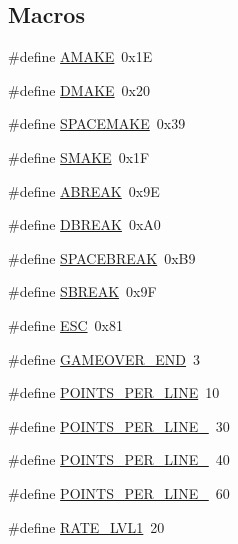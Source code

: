 \subsection*{Macros}
\begin{DoxyCompactItemize}
\item 
\#define \mbox{\hyperlink{group__game_ga690efe7a045abbfc9b27e560a2ec9513}{A\+M\+A\+KE}}~0x1E
\item 
\#define \mbox{\hyperlink{group__game_ga44e36af0ac2ecc5ef350ba0be8942ec2}{D\+M\+A\+KE}}~0x20
\item 
\#define \mbox{\hyperlink{group__game_gac1a92d19df172666cb200a4af8dda91c}{S\+P\+A\+C\+E\+M\+A\+KE}}~0x39
\item 
\#define \mbox{\hyperlink{group__game_ga03947a021c40104691ad783d365f4e10}{S\+M\+A\+KE}}~0x1F
\item 
\#define \mbox{\hyperlink{group__game_ga1e09a1aa8665e3937510ff8c14fc7fa7}{A\+B\+R\+E\+AK}}~0x9E
\item 
\#define \mbox{\hyperlink{group__game_gab38702ad72d18f40a1ee070106d30718}{D\+B\+R\+E\+AK}}~0x\+A0
\item 
\#define \mbox{\hyperlink{group__game_gae1b188c4c1653daaa218b7de29a1d743}{S\+P\+A\+C\+E\+B\+R\+E\+AK}}~0x\+B9
\item 
\#define \mbox{\hyperlink{group__game_ga5b832c74ca8bf6ffabf7d4190eded9f9}{S\+B\+R\+E\+AK}}~0x9F
\item 
\#define \mbox{\hyperlink{group__game_ga4af1b6159e447ba72652bb7fcdfa726e}{E\+SC}}~0x81
\item 
\#define \mbox{\hyperlink{group__game_ga8c3a1040415b05ec42d4ff34b27a7c29}{G\+A\+M\+E\+O\+V\+E\+R\+\_\+\+E\+ND}}~3
\item 
\#define \mbox{\hyperlink{group__game_ga3b5dc51b11999829eff0e40d21279e3b}{P\+O\+I\+N\+T\+S\+\_\+\+P\+E\+R\+\_\+\+L\+I\+NE}}~10
\item 
\#define \mbox{\hyperlink{group__game_ga66dedf1c8c1aefa0530444a033186ac8}{P\+O\+I\+N\+T\+S\+\_\+\+P\+E\+R\+\_\+\+L\+I\+N\+E\+\_}}~30
\item 
\#define \mbox{\hyperlink{group__game_ga9de0f4d507922c46865095e4d4ddd538}{P\+O\+I\+N\+T\+S\+\_\+\+P\+E\+R\+\_\+\+L\+I\+N\+E\+\_}}~40
\item 
\#define \mbox{\hyperlink{group__game_ga16a7908b8d52a1c554db7f11af689c78}{P\+O\+I\+N\+T\+S\+\_\+\+P\+E\+R\+\_\+\+L\+I\+N\+E\+\_}}~60
\item 
\#define \mbox{\hyperlink{group__game_ga77fed468d8077df04b2a583249ea9ec3}{R\+A\+T\+E\+\_\+\+L\+V\+L1}}~20
\item 

\end{DoxyCompactItemize}
